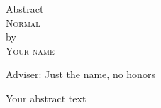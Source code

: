 \begin{center}
Abstract \\
\textsc{Normal} \\
by \\
\textsc{Your name} \\[0.25in]
\end{center}

\vspace{0.25in}

\noindent Adviser: Just the name, no honors

\vspace{0.25in}

\noindent 

Your abstract text